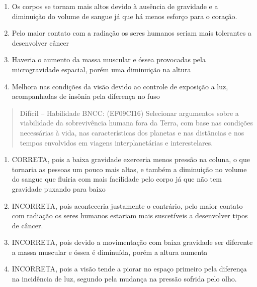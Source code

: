\begin{enumerate}
\def\labelenumi{(\Alph{enumi})}
\item
  Os corpos se tornam mais altos devido à ausência de gravidade e a
  diminuição do volume de sangue já que há menos esforço para o coração.
\item
  Pelo maior contato com a radiação os seres humanos seriam mais
  tolerantes a desenvolver câncer
\item
  Haveria o aumento da massa muscular e óssea provocadas pela
  microgravidade espacial, porém uma diminuição na altura
\item
  Melhora nas condições da visão devido ao controle de exposição a luz,
  acompanhadas de insônia pela diferença no fuso
\end{enumerate}

\begin{quote}
Difícil -- Habilidade BNCC: (EF09CI16) Selecionar argumentos sobre a
viabilidade da sobrevivência humana fora da Terra, com base nas
condições necessárias à vida, nas características dos planetas e nas
distâncias e nos tempos envolvidos em viagens interplanetárias e
interestelares.
\end{quote}

\begin{enumerate}
\def\labelenumi{(\Alph{enumi})}
\item
  CORRETA, pois a baixa gravidade exerceria menos pressão na coluna, o
  que tornaria as pessoas um pouco mais altas, e também a diminuição no
  volume do sangue que fluiria com mais facilidade pelo corpo já que não
  tem gravidade puxando para baixo
\item
  INCORRETA, pois aconteceria justamente o contrário, pelo maior contato
  com radiação os seres humanos estariam mais suscetíveis a desenvolver
  tipos de câncer.
\item
  INCORRETA, pois devido a movimentação com baixa gravidade ser
  diferente a massa muscular e óssea é diminuída, porém a altura aumenta
\item
  INCORRETA, pois a visão tende a piorar no espaço primeiro pela
  diferença na incidência de luz, segundo pela mudança na pressão
  sofrida pelo olho.
\end{enumerate}
